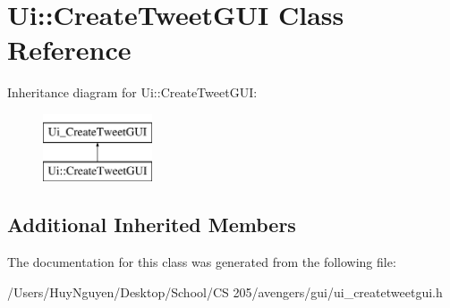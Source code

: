 \hypertarget{classUi_1_1CreateTweetGUI}{}\section{Ui\+:\+:Create\+Tweet\+G\+UI Class Reference}
\label{classUi_1_1CreateTweetGUI}
Inheritance diagram for Ui\+:\+:Create\+Tweet\+G\+UI\+:\begin{figure}[H]
\begin{center}
\leavevmode
\includegraphics[height=2.000000cm]{classUi_1_1CreateTweetGUI}
\end{center}
\end{figure}
\subsection*{Additional Inherited Members}


The documentation for this class was generated from the following file\+:\begin{DoxyCompactItemize}
\item 
/\+Users/\+Huy\+Nguyen/\+Desktop/\+School/\+C\+S 205/avengers/gui/ui\+\_\+createtweetgui.\+h\end{DoxyCompactItemize}
